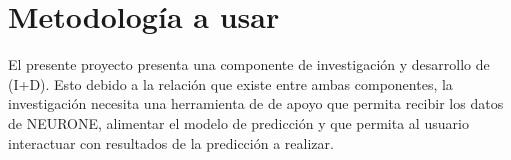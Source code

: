 \section{Metodología a usar}
\label{sec:metodologia}
El presente proyecto presenta una componente de investigación y desarrollo de  (I+D). Esto debido a la relación que existe entre ambas componentes, la investigación necesita una herramienta de  de apoyo que permita recibir los datos de NEURONE, alimentar el modelo de predicción y que permita al usuario interactuar con resultados de la predicción a realizar.